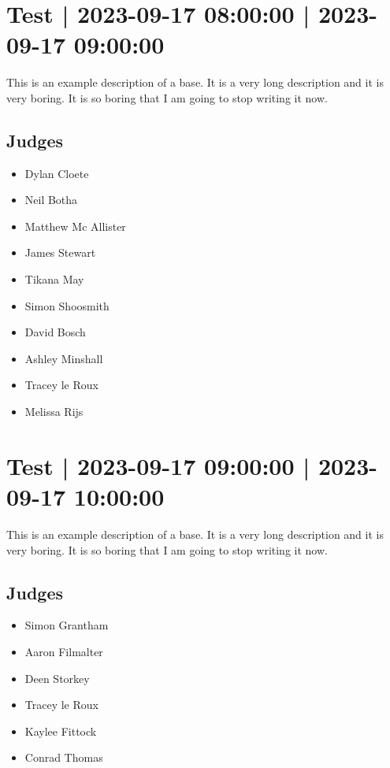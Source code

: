 \documentclass[10pt]{article}
\begin{document}
			\setcounter{section}{31}
	\section{Test | 2023-09-17 08:00:00 | 2023-09-17 09:00:00}
	This is an example description of a base. It is a very long description and it is very boring. It is so boring that I am going to stop writing it now.

	\subsection*{Judges}
	\begin{itemize}

			\item Dylan Cloete
			\item Neil Botha
			\item Matthew Mc Allister
			\item James Stewart
			\item Tikana May
			\item Simon Shoosmith
			\item David Bosch
			\item Ashley Minshall
			\item Tracey le Roux
			\item Melissa Rijs
		\end{itemize}

			\setcounter{section}{32}
	\section{Test | 2023-09-17 09:00:00 | 2023-09-17 10:00:00}
	This is an example description of a base. It is a very long description and it is very boring. It is so boring that I am going to stop writing it now.

	\subsection*{Judges}
	\begin{itemize}

			\item Simon Grantham
			\item Aaron Filmalter
			\item Deen Storkey
			\item Tracey le Roux
			\item Kaylee Fittock
			\item Conrad Thomas
		\end{itemize}
\end{document}
